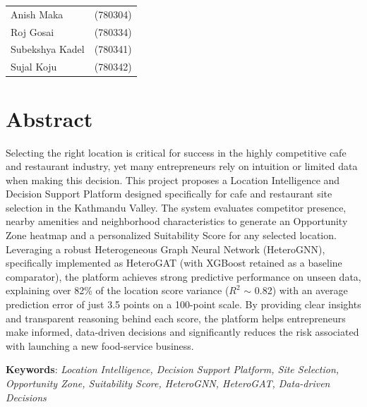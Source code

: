 \begin{table}[h]
	\begin{tabular}{ll}
		Anish Maka      & (780304) \\
		Roj Gosai    & (780334) \\
		Subekshya Kadel & (780341) \\
		Sujal Koju & (780342)
	\end{tabular}
\end{table}
\pagebreak

\large \chapter*{Abstract} \normalsize {} Selecting the right location is critical for success in the highly competitive cafe and restaurant industry, yet many entrepreneurs rely on intuition or limited data when making this decision. This project proposes a Location Intelligence and Decision Support Platform designed specifically for cafe and restaurant site selection in the Kathmandu Valley. The system evaluates competitor presence, nearby amenities and neighborhood characteristics to generate an Opportunity Zone heatmap and a personalized Suitability Score for any selected location. Leveraging a robust Heterogeneous Graph Neural Network (HeteroGNN), specifically implemented as HeteroGAT (with XGBoost retained as a baseline comparator), the platform achieves strong predictive performance on unseen data, explaining over 82\% of the location score variance ($R^2$ $\sim$ 0.82) with an average prediction error of just 3.5 points on a 100-point scale. By providing clear insights and transparent reasoning behind each score, the platform helps entrepreneurs make informed, data-driven decisions and significantly reduces the risk associated with launching a new food-service business.\

\textbf{Keywords}: \textit{Location Intelligence, Decision Support Platform, Site Selection, Opportunity Zone, Suitability Score, HeteroGNN, HeteroGAT, Data-driven Decisions}

\pagebreak